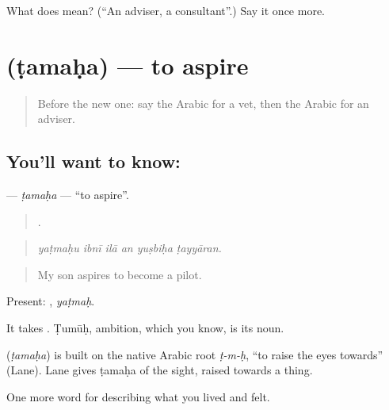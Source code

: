 \begin{tcolorbox}[breakable,colback=teal!4,colframe=teal!35!black,title={Before you move on}]
What does  mean? (\textquotedblleft{}An adviser, a consultant\textquotedblright{}.) Say it once more.
\end{tcolorbox}
\section[\texorpdfstring{\ar{طمح} (ṭamaḥa)}{طمح (ṭamaḥa)}]{ (ṭamaḥa) — to aspire}

\label{lesson:AR-C518-tamaha}



\begin{quote}
Before the new one: say the Arabic for a vet, then the Arabic for an adviser.
\end{quote}

\subsection*{You'll want to know: }
\textbf{} — \emph{ṭamaḥa} — \textquotedblleft{}to aspire\textquotedblright{}.

\begin{quote}
     .
\end{quote}

\begin{quote}
\emph{yaṭmaḥu ibnī ilā an yuṣbiḥa ṭayyāran.}
\end{quote}

\begin{quote}
My son aspires to become a pilot.
\end{quote}

Present: , \emph{yaṭmaḥ}.

It takes . Ṭumūḥ, ambition, which you know, is its noun.

\begin{cousinweb}
\textbf{} (\emph{ṭamaḥa}) is built on the native Arabic root \emph{ṭ-m-ḥ}, \textquotedblleft{}to raise the eyes towards\textquotedblright{} (Lane). Lane gives ṭamaḥa of the sight, raised towards a thing.
\end{cousinweb}

\begin{grammarlens}[title={What you've built}]
One more word for describing what you lived and felt.
\end{grammarlens}

